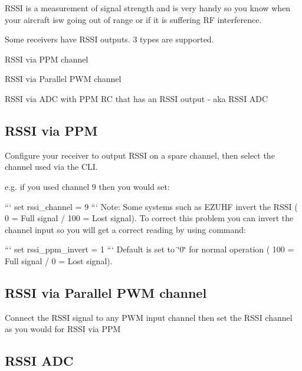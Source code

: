 R\+S\+S\+I is a measurement of signal strength and is very handy so you know when your aircraft isw going out of range or if it is suffering R\+F interference.

Some receivers have R\+S\+S\+I outputs. 3 types are supported.


\begin{DoxyEnumerate}
\item R\+S\+S\+I via P\+P\+M channel
\end{DoxyEnumerate}
\begin{DoxyEnumerate}
\item R\+S\+S\+I via Parallel P\+W\+M channel
\end{DoxyEnumerate}
\begin{DoxyEnumerate}
\item R\+S\+S\+I via A\+D\+C with P\+P\+M R\+C that has an R\+S\+S\+I output -\/ aka R\+S\+S\+I A\+D\+C
\end{DoxyEnumerate}

\subsection*{R\+S\+S\+I via P\+P\+M}

Configure your receiver to output R\+S\+S\+I on a spare channel, then select the channel used via the C\+L\+I.

e.\+g. if you used channel 9 then you would set\+:

``` set rssi\+\_\+channel = 9 ``` Note\+: Some systems such as E\+Z\+U\+H\+F invert the R\+S\+S\+I ( 0 = Full signal / 100 = Lost signal). To correct this problem you can invert the channel input so you will get a correct reading by using command\+:

``` set rssi\+\_\+ppm\+\_\+invert = 1 ``` Default is set to \char`\"{}0\char`\"{} for normal operation ( 100 = Full signal / 0 = Lost signal).

\subsection*{R\+S\+S\+I via Parallel P\+W\+M channel}

Connect the R\+S\+S\+I signal to any P\+W\+M input channel then set the R\+S\+S\+I channel as you would for R\+S\+S\+I via P\+P\+M

\subsection*{R\+S\+S\+I A\+D\+C}


